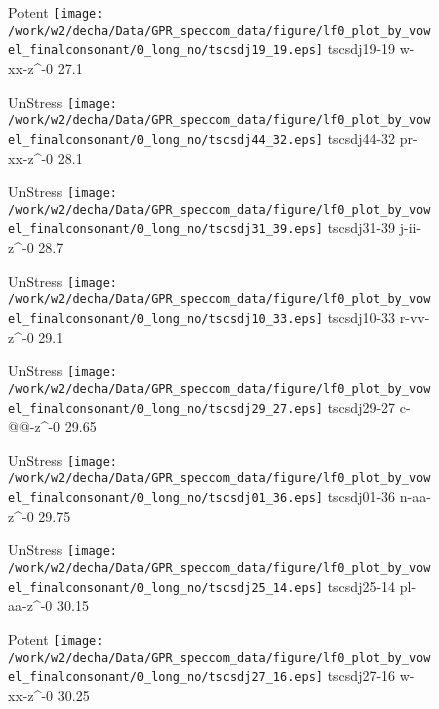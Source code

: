 \documentclass{article}
\begin{document}
\begin{figure}[t]
\begin{minipage}[b]{.24\textwidth}
\colorbox{Apricot}{Potent}
\centering
\texttt{[image: /work/w2/decha/Data/GPR\_speccom\_data/figure/lf0\_plot\_by\_vowel\_finalconsonant/0\_long\_no/tscsdj19\_19.eps]}
tscsdj19-19 w-xx-z\textasciicircum-0 27.1
\end{minipage}
\begin{minipage}[b]{.24\textwidth}
UnStress
\centering
\texttt{[image: /work/w2/decha/Data/GPR\_speccom\_data/figure/lf0\_plot\_by\_vowel\_finalconsonant/0\_long\_no/tscsdj44\_32.eps]}
tscsdj44-32 pr-xx-z\textasciicircum-0 28.1
\end{minipage}
\begin{minipage}[b]{.24\textwidth}
UnStress
\centering
\texttt{[image: /work/w2/decha/Data/GPR\_speccom\_data/figure/lf0\_plot\_by\_vowel\_finalconsonant/0\_long\_no/tscsdj31\_39.eps]}
tscsdj31-39 j-ii-z\textasciicircum-0 28.7
\end{minipage}
\begin{minipage}[b]{.24\textwidth}
UnStress
\centering
\texttt{[image: /work/w2/decha/Data/GPR\_speccom\_data/figure/lf0\_plot\_by\_vowel\_finalconsonant/0\_long\_no/tscsdj10\_33.eps]}
tscsdj10-33 r-vv-z\textasciicircum-0 29.1
\end{minipage}
\end{figure}

\begin{figure}[t]
\begin{minipage}[b]{.24\textwidth}
UnStress
\centering
\texttt{[image: /work/w2/decha/Data/GPR\_speccom\_data/figure/lf0\_plot\_by\_vowel\_finalconsonant/0\_long\_no/tscsdj29\_27.eps]}
tscsdj29-27 c-@@-z\textasciicircum-0 29.65
\end{minipage}
\begin{minipage}[b]{.24\textwidth}
UnStress
\centering
\texttt{[image: /work/w2/decha/Data/GPR\_speccom\_data/figure/lf0\_plot\_by\_vowel\_finalconsonant/0\_long\_no/tscsdj01\_36.eps]}
tscsdj01-36 n-aa-z\textasciicircum-0 29.75
\end{minipage}
\begin{minipage}[b]{.24\textwidth}
UnStress
\centering
\texttt{[image: /work/w2/decha/Data/GPR\_speccom\_data/figure/lf0\_plot\_by\_vowel\_finalconsonant/0\_long\_no/tscsdj25\_14.eps]}
tscsdj25-14 pl-aa-z\textasciicircum-0 30.15
\end{minipage}
\begin{minipage}[b]{.24\textwidth}
\colorbox{Apricot}{Potent}
\centering
\texttt{[image: /work/w2/decha/Data/GPR\_speccom\_data/figure/lf0\_plot\_by\_vowel\_finalconsonant/0\_long\_no/tscsdj27\_16.eps]}
tscsdj27-16 w-xx-z\textasciicircum-0 30.25
\end{minipage}
\end{figure}
\end{document}
